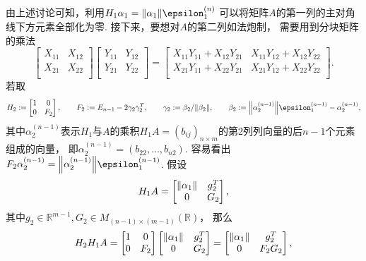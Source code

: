 由上述讨论可知，利用\(H_1 \alpha_1 = \norm{\alpha_1} \epsilon^{(n)}_1\)
可以将矩阵\(A\)的第一列的主对角线下方元素全部化为零.
接下来，要想对\(A\)的第二列如法炮制，
需要用到分块矩阵的乘法\begin{equation*}
	\begin{bmatrix}
		X_{11} & X_{12} \\
		X_{21} & X_{22} \\
	\end{bmatrix}
	\begin{bmatrix}
		Y_{11} & Y_{12} \\
		Y_{21} & Y_{22} \\
	\end{bmatrix}
	= \begin{bmatrix}
		X_{11} Y_{11} + X_{12} Y_{21} & X_{11} Y_{12} + X_{12} Y_{22} \\
		X_{21} Y_{11} + X_{22} Y_{21} & X_{21} Y_{12} + X_{22} Y_{22} \\
	\end{bmatrix}.
\end{equation*}
若取\begin{equation*}
	H_2 \defeq \begin{bmatrix}
		1 & 0 \\
		0 & F_2 \\
	\end{bmatrix},
	\qquad
	F_2 \defeq E_{n-1} - 2 \gamma_2 \gamma_2^T,
	\qquad
	\gamma_2 \defeq \beta_2 / \norm{\beta_2},
	\qquad
	\beta_2 \defeq \norm{\alpha_2^{(n-1)}} \epsilon^{(n-1)}_1 - \alpha_2^{(n-1)},
\end{equation*}
其中\(\alpha_2^{(n-1)}\)表示\(H_1\)与\(A\)的乘积\(H_1 A = (b_{ij})_{n \times m}\)的第2列列向量的后\(n-1\)个元素组成的向量，
即\(\alpha_2^{(n-1)} = (b_{22},\dotsc,b_{n2})\).
容易看出\(F_2 \alpha_2^{(n-1)} = \norm{\alpha_2^{(n-1)}} \epsilon^{(n-1)}_1\).
假设\begin{equation*}
	H_1 A
	=
	\begin{bmatrix}
		\norm{\alpha_1} & g_2^T \\
		0 & G_2 \\
	\end{bmatrix},
\end{equation*}
其中\(g_2 \in \mathbb{R}^{m-1}, G_2 \in M_{(n-1) \times (m-1)}(\mathbb{R})\)，
那么\begin{equation*}
	H_2 H_1 A
	= \begin{bmatrix}
		1 & 0 \\
		0 & F_2 \\
	\end{bmatrix}
	\begin{bmatrix}
		\norm{\alpha_1} & g_2^T \\
		0 & G_2 \\
	\end{bmatrix}
	= \begin{bmatrix}
		\norm{\alpha_1} & g_2^T \\
		0 & F_2 G_2 \\
	\end{bmatrix},
\end{equation*}
